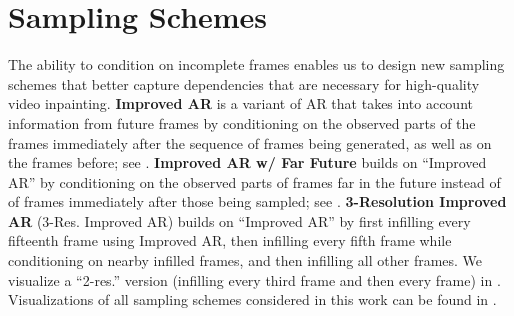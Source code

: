 \section{Sampling Schemes}\label{sec:samplingschemes}
The ability to condition on incomplete frames enables us to design new sampling schemes that better capture dependencies that are necessary for high-quality video inpainting. \textbf{Improved AR} is a variant of AR that takes into account information from future frames by conditioning on the observed parts of the frames immediately after the sequence of frames being generated, as well as on the frames before; see . \textbf{Improved AR w/ Far Future} builds on ``Improved AR'' by conditioning on the observed parts of frames far in the future instead of of frames immediately after those being sampled; see .
\textbf{3-Resolution Improved AR} (3-Res. Improved AR) builds on ``Improved AR'' by first infilling every fifteenth frame using Improved AR, then infilling every fifth frame while conditioning on nearby infilled frames, and then infilling all other frames. We visualize a ``2-res.'' version (infilling every third frame and then every frame) in . Visualizations of all sampling schemes considered in this work can be found in .




